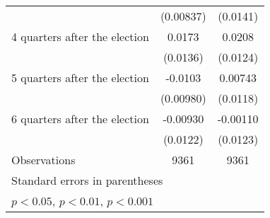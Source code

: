 \begin{table}[htbp]
\begin{tabular}{l*{2}{c}}
                    &   (0.00837)         &    (0.0141)         \\
[1em]
 4 quarters after the election&      0.0173         &      0.0208         \\
                    &    (0.0136)         &    (0.0124)         \\
[1em]
 5 quarters after the election&     -0.0103         &     0.00743         \\
                    &   (0.00980)         &    (0.0118)         \\
[1em]
 6 quarters after the election&    -0.00930         &    -0.00110         \\
                    &    (0.0122)         &    (0.0123)         \\
\hline
Observations        &        9361         &        9361         \\
\hline\hline
\multicolumn{3}{l}{\footnotesize Standard errors in parentheses}\\
\multicolumn{3}{l}{\footnotesize \sym{*} \(p<0.05\), \sym{**} \(p<0.01\), \sym{***} \(p<0.001\)}\\
\end{tabular}
\end{table}
